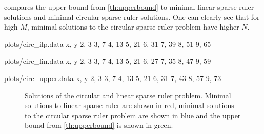 \documentclass[a4paper, openany, oneside]{memoir}
\begin{document}
 compares the upper bound from \cref{th:upperbound} to minimal linear sparse ruler solutions and minimal circular sparse ruler solutions. One can clearly see that for high $M$, minimal solutions to the circular sparse ruler problem have higher $N$.

\begin{filecontents*}{plots/circ_ilp.data}
x, y
2, 3
3, 7
4, 13
5, 21
6, 31
7, 39
8, 51
9, 65
\end{filecontents*}

\begin{filecontents*}{plots/circ_lin.data}
x, y
2, 3
3, 7
4, 13
5, 21
6, 27
7, 35
8, 47
9, 59
\end{filecontents*}

\begin{filecontents*}{plots/circ_upper.data}
x, y
2, 3
3, 7
4, 13
5, 21
6, 31
7, 43
8, 57
9, 73
\end{filecontents*}

\begin{figure}
    \centering
    \caption{Solutions of the circular and linear sparse ruler problem. Minimal solutions to linear sparse ruler are shown in red, minimal solutions to the circular sparse ruler problem are shown in blue and the upper bound from \cref{th:upperbound} is shown in green.}
    \label{fig:comparison_sparse_ruler}
\end{figure}
\end{document}
